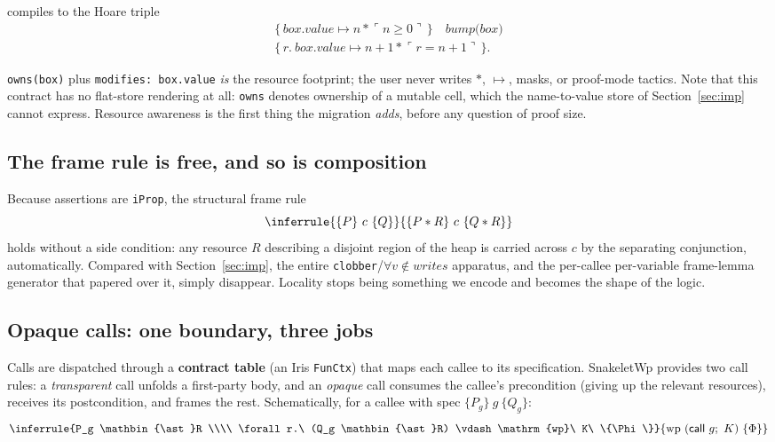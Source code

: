 \documentclass[sigconf,nonacm]{acmart}
\newcommand{\sepc}{\mathbin{\ast}}
\newcommand{\pto}{\mapsto}
\newcommand{\pure}[1]{\ulcorner #1 \urcorner}
\newcommand{\wpre}{\mathrm{wp}}
\newcommand{\hoare}[3]{\{#1\}\ #2\ \{#3\}}
\newcommand{\code}[1]{\texttt{#1}}
\begin{document}
compiles to the Hoare triple
\begin{multline*}
\{\,\textit{box.value} \pto n \sepc \pure{n \ge 0}\,\}\quad
\textit{bump(box)} \\
\{\,r.\ \textit{box.value} \pto n{+}1 \sepc \pure{r = n{+}1}\,\}.
\end{multline*}

\code{owns(box)} plus \code{modifies: box.value} \emph{is} the resource
footprint; the user never writes $\sepc$, $\pto$, masks, or proof-mode tactics.
Note that this contract has no flat-store rendering at all: \code{owns} denotes
ownership of a mutable cell, which the name-to-value store of Section~\ref{sec:imp}
cannot express. Resource awareness is the first thing the migration \emph{adds},
before any question of proof size.

\subsection{The frame rule is free, and so is composition}

Because assertions are \code{iProp}, the structural frame rule
\[
\inferrule{\hoare{P}{c}{Q}}{\hoare{P \sepc R}{c}{Q \sepc R}}
\]
holds without a side condition: any resource $R$ describing a disjoint region of
the heap is carried across $c$ by the separating conjunction, automatically.
Compared with Section~\ref{sec:imp}, the entire \code{clobber}/$\forall v \notin
\textit{writes}$ apparatus, and the per-callee per-variable frame-lemma generator
that papered over it, simply disappear. Locality stops being something we encode
and becomes the shape of the logic.

\subsection{Opaque calls: one boundary, three jobs}
\label{sec:opaque}

Calls are dispatched through a \textbf{contract table} (an Iris \code{FunCtx})
that maps each callee to its specification. SnakeletWp provides two call rules: a
\emph{transparent} call unfolds a first-party body, and an \emph{opaque} call
consumes the callee's precondition (giving up the relevant resources), receives
its postcondition, and frames the rest. Schematically, for a callee with spec
$\hoare{P_g}{g}{Q_g}$:
\[
\inferrule{P_g \sepc R \\\\
  \forall r.\ (Q_g \sepc R) \vdash \wpre\ K\ \{\Phi\}}
{\wpre\ (\mathsf{call}\ g;\ K)\ \{\Phi\}}
\]
\end{document}

